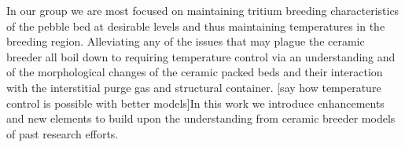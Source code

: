 In our group we are most focused on maintaining tritium breeding characteristics of the pebble bed at desirable levels and thus maintaining temperatures in the breeding region. Alleviating any of the issues that may plague the ceramic breeder all boil down to requiring temperature control via an understanding and of the morphological changes of the ceramic packed beds and their interaction with the interstitial purge gas and structural container. [say how temperature control is possible with better models]In this work we introduce enhancements and new elements to build upon the understanding from ceramic breeder models of past research efforts. 










